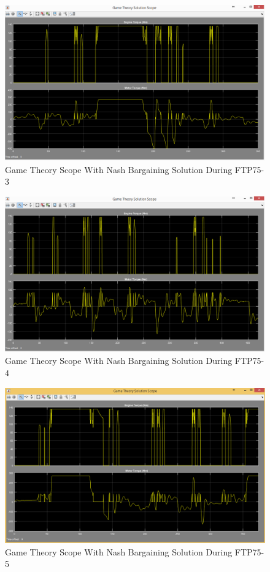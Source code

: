 \begin{figure}[h]
\centering
\includegraphics[scale=0.49]{figures/NashSolution/FTP75-3/gameTheory20Juni}
\caption{Game Theory Scope With Nash Bargaining Solution During FTP75-3}
\label{fig:gtns3}
\end{figure}

\begin{figure}[h]
\centering
\includegraphics[scale=0.49]{figures/NashSolution/FTP75-4/gameTheory21Juni}
\caption{Game Theory Scope With Nash Bargaining Solution During FTP75-4}
\label{fig:gtns4}
\end{figure}

\begin{figure}[h]
\centering
\includegraphics[scale=0.49]{figures/NashSolution/FTP75-5/gameTheory22Juni}
\caption{Game Theory Scope With Nash Bargaining Solution During FTP75-5}
\label{fig:gtns5}
\end{figure}


